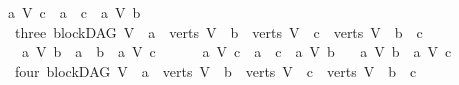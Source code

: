 \begin{isabellebody}
\ \ {\isacharparenleft}{\kern0pt}{\isacharparenleft}{\kern0pt}a\ {\isasymrightarrow}\isactrlsup {\isacharplus}{\kern0pt}\isactrlbsub V\isactrlesub \ c{\isacharparenright}{\kern0pt}\ {\isasymor}\ a\ {\isacharequal}{\kern0pt}\ c{\isacharparenright}{\kern0pt}\ {\isasymand}\ {\isasymnot}{\isacharparenleft}{\kern0pt}a\ {\isasymrightarrow}\isactrlsup {\isacharplus}{\kern0pt}\isactrlbsub V\isactrlesub \ b{\isacharparenright}{\kern0pt}{\isachardoublequoteclose}\isanewline
\ \ {\isacharbar}{\kern0pt}\ {\isacharparenleft}{\kern0pt}three{\isacharparenright}{\kern0pt}\ {\isachardoublequoteopen}{\isacharparenleft}{\kern0pt}blockDAG\ V\ {\isasymand}\ a\ {\isasymin}\ verts\ V\ {\isasymand}\ b\ {\isasymin}\ verts\ V\ {\isasymand}\ c\ {\isasymin}\ verts\ V{\isacharparenright}{\kern0pt}\ {\isasymand}\ b\ {\isasymnoteq}\ c\ \isanewline
\ \ \ {\isasymand}\ {\isasymnot}{\isacharparenleft}{\kern0pt}{\isacharparenleft}{\kern0pt}{\isacharparenleft}{\kern0pt}a\ {\isasymrightarrow}\isactrlsup {\isacharplus}{\kern0pt}\isactrlbsub V\isactrlesub \ b{\isacharparenright}{\kern0pt}\ {\isasymor}\ a\ {\isacharequal}{\kern0pt}\ b{\isacharparenright}{\kern0pt}\ {\isasymand}\ {\isasymnot}{\isacharparenleft}{\kern0pt}a\ {\isasymrightarrow}\isactrlsup {\isacharplus}{\kern0pt}\isactrlbsub V\isactrlesub \ c{\isacharparenright}{\kern0pt}{\isacharparenright}{\kern0pt}\ {\isasymand}\ \ \isanewline
\ \ \ {\isasymnot}{\isacharparenleft}{\kern0pt}{\isacharparenleft}{\kern0pt}{\isacharparenleft}{\kern0pt}a\ {\isasymrightarrow}\isactrlsup {\isacharplus}{\kern0pt}\isactrlbsub V\isactrlesub \ c{\isacharparenright}{\kern0pt}\ {\isasymor}\ a\ {\isacharequal}{\kern0pt}\ c{\isacharparenright}{\kern0pt}\ {\isasymand}\ {\isasymnot}{\isacharparenleft}{\kern0pt}a\ {\isasymrightarrow}\isactrlsup {\isacharplus}{\kern0pt}\isactrlbsub V\isactrlesub \ b{\isacharparenright}{\kern0pt}{\isacharparenright}{\kern0pt}{\isasymand}\ \isanewline
\ \ {\isacharparenleft}{\kern0pt}{\isacharparenleft}{\kern0pt}a\ {\isasymrightarrow}\isactrlsup {\isacharplus}{\kern0pt}\isactrlbsub V\isactrlesub \ b{\isacharparenright}{\kern0pt}\ {\isasymand}\ {\isacharparenleft}{\kern0pt}a\ {\isasymrightarrow}\isactrlsup {\isacharplus}{\kern0pt}\isactrlbsub V\isactrlesub \ c{\isacharparenright}{\kern0pt}{\isacharparenright}{\kern0pt}{\isachardoublequoteclose}\isanewline
\ \ {\isacharbar}{\kern0pt}\ {\isacharparenleft}{\kern0pt}four{\isacharparenright}{\kern0pt}\ {\isachardoublequoteopen}{\isacharparenleft}{\kern0pt}blockDAG\ V\ {\isasymand}\ a\ {\isasymin}\ verts\ V\ {\isasymand}\ b\ {\isasymin}\ verts\ V\ {\isasymand}\ c\ {\isasymin}\ verts\ V{\isacharparenright}{\kern0pt}\ {\isasymand}\ b\ {\isasymnoteq}\ c\ \ {\isasymand}\isanewline

\end{isabellebody}
